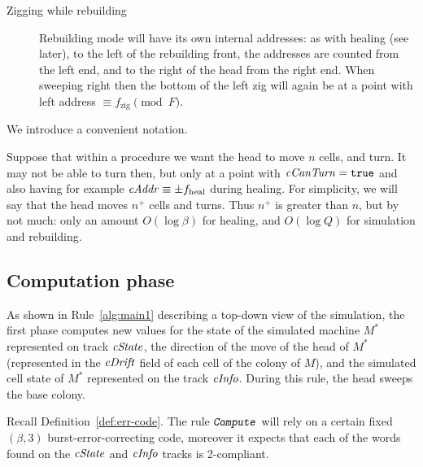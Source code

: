 \documentclass[12pt]{memoir}
\newcommand{\fld}[1]{\ensuremath{\textit{#1\/}}}
\newcommand{\rul}[1]{\ensuremath{\texttt{\slshape #1\/}}}
\newcommand{\tEnd}{f_{\mathrm{end}}}
\newcommand{\tZig}{f_{\mathrm{zig}}}
\newcommand{\tHeal}{f_{\mathrm{heal}}}
\newcommand{\E}{E}
\newcommand{\Q}{Q}
\newcommand{\F}{F}
\newcommand{\cAddr}{\fld{cAddr}}
\newcommand{\cCanTurn}{\fld{cCanTurn}}
\newcommand{\cDrift}{\fld{cDrift}}
\newcommand{\cInfo}{\fld{cInfo}}
\newcommand{\cState}{\fld{cState}}
\newcommand{\PadLen}{\mathit{PadLen}}
\newcommand{\Comp}{\rul{Compute}}
\begin{document}
\begin{description}
\item[Zigging while rebuilding]
Rebuilding mode will have its own internal addresses: as with healing (see later),
to the left of the rebuilding front, the addresses are counted from the left end, and to the right
of the head from the right end.
When sweeping right then the bottom of the left zig will again be at a 
point with left address \( \equiv\tZig\pmod{\F} \).


\end{description}

We introduce a convenient notation.
\begin{notation}\label{not:plus}
Suppose that within a procedure we want the head to move \( n \) cells, and turn.
It may not be able to turn then, but only at a point with \( \cCanTurn=\true \) and
also having  for example \( \cAddr\equiv\pm\tHeal \) during healing.
For simplicity, we will say that the head moves \( n^{+} \) cells and turns.
Thus \( n^{+} \) is greater than \( n \), but by not much: only an amount \( O(\log\beta) \) for healing,
and \( O(\log \Q) \) for simulation and rebuilding.
\end{notation}

\subsection{Computation phase}\label{sec:computation-phase}

As shown in Rule~\ref{alg:main1} describing a top-down view of the simulation,
the first phase computes new values for the state of the 
simulated machine \( M^{*} \)
represented on track \( \cState \), the direction of the move of the head of  \( M^{*} \)
(represented in the \( \cDrift \) field of each cell of the colony of \( M \)), and
the simulated cell state of \( M^{*} \) represented on the track \( \cInfo \).
During this rule, the head sweeps the base colony.

Recall Definition~\ref{def:err-code}.
The rule \( \Comp \) will rely on a certain fixed \( (\beta,3) \) burst-error-correcting
code, moreover
it expects that each of the words found on the \( \cState \) and \( \cInfo \) tracks
is 2-compliant.  %
\end{document}
